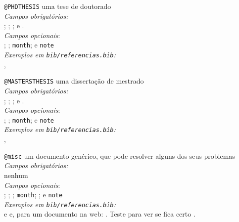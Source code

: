 \begin{alineas}
	\item \verb|@PHDTHESIS| uma tese de doutorado \\
		\emph{Campos obrigatórios:}\\
 			\hspace*{1em}; ; ; e .\\
		\emph{Campos opcionais}:\\
			 \hspace*{1em}  ;
			 ; \texttt{month};
			 e \texttt{note}\\
		\emph{Exemplos em \texttt{bib/referencias.bib}:} \\
				, \cite{cunha13}
	
	\item \verb|@MASTERSTHESIS| uma dissertação de mestrado \\
		\emph{Campos obrigatórios:}\\
 			\hspace*{1em}; ; ; e .\\
		\emph{Campos opcionais}:\\
			 \hspace*{1em}  ;
			 ; \texttt{month};
			 e \texttt{note}\\
		\emph{Exemplos em \texttt{bib/referencias.bib}:} \\
				, \cite{cunha09}
					
	\item \verb|@misc| um documento genérico, que pode resolver
		alguns dos seus problemas \\
		\emph{Campos obrigatórios:}\\
 			\hspace*{1em}nenhum\\
		\emph{Campos opcionais}:\\
			 \hspace*{1em}; ; 
			 ; \texttt{month}; ;
			 e \texttt{note}\\
		\emph{Exemplos em \texttt{bib/referencias.bib}:} \\
				 e \cite{oli87} e, para um documento na
				web: \cite{epsl}. Teste para ver se fica certo 
				\cite{epsl, epslatex06}.
			
\end{alineas}


